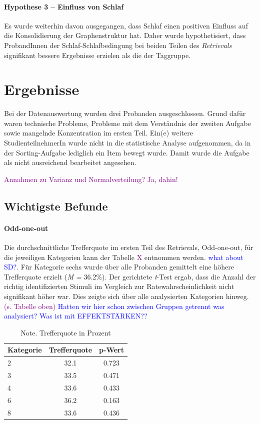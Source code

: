 \documentclass[preprint,12pt]{elsarticle}
\begin{document}
\paragraph{Hypothese 3 – Einfluss von Schlaf}
Es wurde weiterhin davon ausgegangen, dass Schlaf einen positiven Einfluss auf die Konsolidierung der Graphenstruktur hat. Daher wurde hypothetisiert, dass ProbandInnen der Schlaf-Schlafbedingung bei beiden Teilen des \textit{Retrievals} signifikant bessere Ergebnisse erzielen als die der Taggruppe.

\section{Ergebnisse}
\label{S:3}
Bei der Datenauswertung wurden drei Probanden ausgeschlossen. Grund dafür waren technische Probleme, Probleme mit dem Verständnis der zweiten Aufgabe sowie mangelnde Konzentration im ersten Teil.
Ein(e) weitere StudienteilnehmerIn wurde nicht in die statistische Analyse aufgenommen, da in der Sorting-Aufgabe lediglich ein Item bewegt wurde. Damit wurde die Aufgabe als nicht ausreichend bearbeitet angesehen.

\textcolor{purple}{Annahmen zu Varianz und Normalverteilung? Ja, dahin!}

\subsection{Wichtigste Befunde}
\paragraph{Odd-one-out}
Die durchschnittliche Trefferquote im ersten Teil des Retrievals, Odd-one-out, für die jeweiligen Kategorien kann der Tabelle \textcolor{purple}{X} entnommen werden. \textcolor{blue}{what about SD?}. Für Kategorie sechs wurde über alle Probanden gemittelt eine höhere Trefferquote erzielt (\textit{M =} 36.2\%).
Der gerichtete \textit{t}-Test ergab, dass die Anzahl der richtig identifizierten Stimuli im Vergleich zur Ratewahrscheinlichkeit nicht signifikant höher war. Dies zeigte sich über alle analysierten Kategorien hinweg. \textcolor{purple}{(s. Tabelle oben)}
\textcolor{blue}{Hatten wir hier schon zwischen Gruppen getrennt was analysiert?}
\textcolor{blue}{Was ist mit EFFEKTSTÄRKEN??}

\begin{table}[h]
\centering
\begin{tabular}{l c c} %
\hline
\textbf{Kategorie} & \textbf{Trefferquote} & \textbf{p-Wert}\\
\hline
2 & 32.1 & 0.723\\
3 & 33.5 & 0.471\\
4 & 33.6 & 0.433\\
6 & 36.2 & 0.163\\
8 & 33.6 & 0.436\\
\hline
\end{tabular}
\caption{Note. Trefferquote in Prozent}
\end{table}
\end{document}
